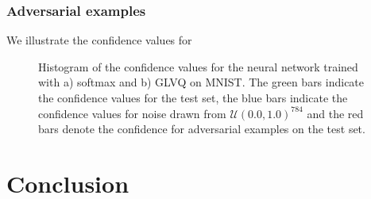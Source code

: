 \documentclass{esannV2}
\begin{document}
\subsubsection{Adversarial examples}
We illustrate the confidence values for 

\begin{figure}[t]
\caption{Histogram of the confidence values for the neural network trained with a) softmax and b) GLVQ on MNIST. The green bars indicate the confidence values for the test set, the blue bars indicate the confidence values for noise drawn from $\mathcal{U}(0.0, 1.0)^{784}$ and the red bars denote the confidence for adversarial examples on the test set.}
\end{figure}


\section{Conclusion}

\end{document}
